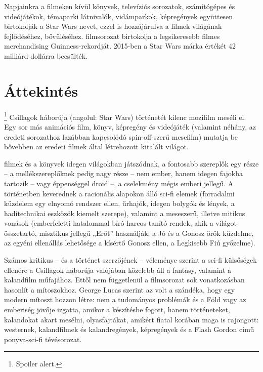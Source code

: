 \documentclass[]{thesis-ekf}
\theoremstyle{definition}
\theoremstyle{remark}
\begin{document}
	Napjainkra a filmeken kívül könyvek, televíziós sorozatok, számítógépes és videójátékok, témaparki látnivalók, vidámparkok, képregények együttesen birtokolják a Star Wars nevet, ezzel is hozzájárulva a filmek világának fejlődéséhez, bővüléséhez. \Az filmsorozat birtokolja a legsikeresebb filmes merchandising Guinness-rekordját. 2015-ben a Star Wars márka értékét 42 milliárd dollárra becsülték.
	
	\section{Áttekintés}\footnote{Spoiler alert.}
	\Az Csillagok háborúja (angolul: Star Wars) történetét kilenc mozifilm meséli el. Egy sor más animációs film, könyv, képregény és videójáték (valamint néhány, az eredeti sorozathoz lazábban kapcsolódó spin-off-szerű mesefilm) mutatja be bővebben az eredeti filmek által létrehozott kitalált világot.
	
	\Az filmek és a könyvek idegen világokban játszódnak, a fontosabb szereplők egy része – a mellékszereplőknek pedig nagy része – nem ember, hanem idegen fajokba tartozik – vagy éppenséggel droid –, a cselekmény mégis emberi jellegű. A történetben keverednek a racionális alapokon álló sci-fi elemek (forradalmi küzdelem egy elnyomó rendszer ellen, űrhajók, idegen bolygók és lények, a haditechnikai eszközök kiemelt szerepe), valamint a meseszerű, illetve mitikus vonások (emberfeletti hatalommal bíró harcos-tanító rendek, akik a világot összetartó, misztikus jellegű „Erőt” használják; a Jó és a Gonosz örök küzdelme, az egyéni ellenállás lehetősége a kísértő Gonosz ellen, a Legkisebb Fiú győzelme).
	
	Számos kritikus – és a történet szerzőjének – véleménye szerint a sci-fi külsőségek ellenére a Csillagok háborúja valójában közelebb áll a fantasy, valamint a kalandfilm műfajához. Ettől nem függetlenül a filmsorozat sok vonatkozásban hasonlít a mítoszokhoz. George Lucas szerint az volt a szándéka, hogy egy modern mítoszt hozzon létre: nem a tudományos problémák és a Föld vagy az emberiség jövője izgatta, amikor a készítésbe fogott, hanem történeteket, kalandokat akart mesélni, olyasfajtákat, amikért fiatal korában maga is rajongott: westernek, kalandfilmek és kalandregények, képregények és a Flash Gordon című ponyva-sci-fi tévésorozat. 
	
\end{document}
